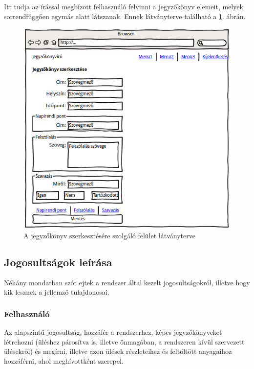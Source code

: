 \documentclass[a4paper,12pt,oneside]{report}
\begin{document}
Itt tudja az írással megbízott felhasználó felvinni a jegyzőkönyv elemeit, melyek sorrendfüggően egymás alatt látszanak. Ennek látványterve található a \ref{fig:wireframe-jegyzokonyvszerkesztes}. ábrán.

\begin{figure}[h]
    \includegraphics[width=\textwidth]{wireframe-jegyzokonyvszerkesztes}
    \caption{A jegyzőkönyv szerkesztésére szolgáló felület látványterve}
    \label{fig:wireframe-jegyzokonyvszerkesztes}
\end{figure}

\subsection{Jogosultságok leírása}

Néhány mondatban szót ejtek a rendszer által kezelt jogosultságokról, illetve hogy kik lesznek a jellemző tulajdonosai.

\subsubsection*{Felhasználó}

Az alapszintű jogosultság, hozzáfér a rendszerhez, képes jegyzőkönyveket létrehozni (üléshez párosítva is, illetve önmagában, a rendszeren kívül szervezett ülésekről) és megírni, illetve azon ülések részleteihez és feltöltött anyagaihoz hozzáférni, ahol meghívottként szerepel.
\end{document}
